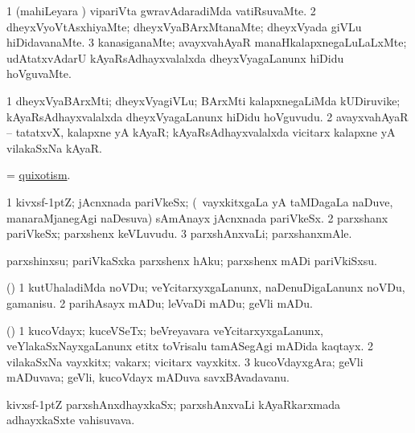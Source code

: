 \bentry
{}
\gl{\kirxvi}
\bmng
\bnum
\num{1} (mahiLeyara \vi) vipariVta gwravAdaradiMda vatiRsuvaMte. 
\num{2} dheyxVyoVtAsxhiyaMte; dheyxVyaBArxMtanaMte; dheyxVyada giVLu hiDidavanaMte. 
\num{3} kanasiganaMte; avayxvahAyaR manaHkalapxnegaLuLaLxMte; udAtatxvAdarU kAyaRsAdhayxvalalxda dheyxVyagaLanunx hiDidu hoVguvaMte. 
\enum
\emng
\eentry

\bentry
{}
\gl{\nA}
\bmng
\bnum
\num{1} dheyxVyaBArxMti; dheyxVyagiVLu; BArxMti kalapxnegaLiMda kUDiruvike; kAyaRsAdhayxvalalxda dheyxVyagaLanunx hiDidu hoVguvudu. 
\num{2} avayxvahAyaR -- tatatxvX, kalapxne yA kAyaR; kAyaRsAdhayxvalalxda vicitarx kalapxne yA vilakaSxNa kAyaR. 
\enum
\emng
\eentry

\bentry
{}
\gl{\nA}
\bmng
= \hyperlink{quixotism}{quixotism}. 
\emng
\eentry

\bentry
{}
\gl{\nA}
\bmng
\bnum
\num{1} kivxsf\kern -1ptZ; jAcnxnada pariVkeSx; (\kanmu\ vayxkitxgaLa yA taMDagaLa naDuve, manaraMjanegAgi naDesuva) sAmAnayx jAcnxnada pariVkeSx. 
\num{2} parxshanx pariVkeSx; parxshenx keVLuvudu. 
\num{3} parxshAnxvaLi; parxshanxmAle. 
\enum
\emng
\eentry

\bentry
{}
\gl{\sakirx}
\bmng
parxshinxsu; pariVkaSxka parxshenx hAku; parxshenx mADi pariVkiSxsu. 
\emng
\eentry

\bentry
{}
\gl{\sakirx}
\bmng
(\pArxparx) 
\bnum
\num{1} kutUhaladiMda noVDu; veYcitarxyxgaLanunx, naDenuDigaLanunx noVDu, gamanisu. 
\num{2} parihAsayx mADu; leVvaDi mADu; geVli mADu. 
\enum
\emng
\eentry

\bentry
{}
\gl{\nA}
\bmng
(\pArxparx) 
\bnum
\num{1} kucoVdayx; kuceVSeTx; beVreyavara veYcitarxyxgaLanunx, veYlakaSxNayxgaLanunx etitx toVrisalu tamASegAgi mADida kaqtayx. 
\num{2} vilakaSxNa vayxkitx; vakarx; vicitarx vayxkitx. 
\num{3} kucoVdayxgAra; geVli mADuvava; geVli, kucoVdayx mADuva savxBAvadavanu. 
\enum
\emng
\eentry

\bentry
{}
\gl{\nA}
\bmng
kivxsf\kern -1ptZ parxshAnxdhayxkaSx; parxshAnxvaLi kAyaRkarxmada adhayxkaSxte vahisuvava. 
\emng
\eentry

